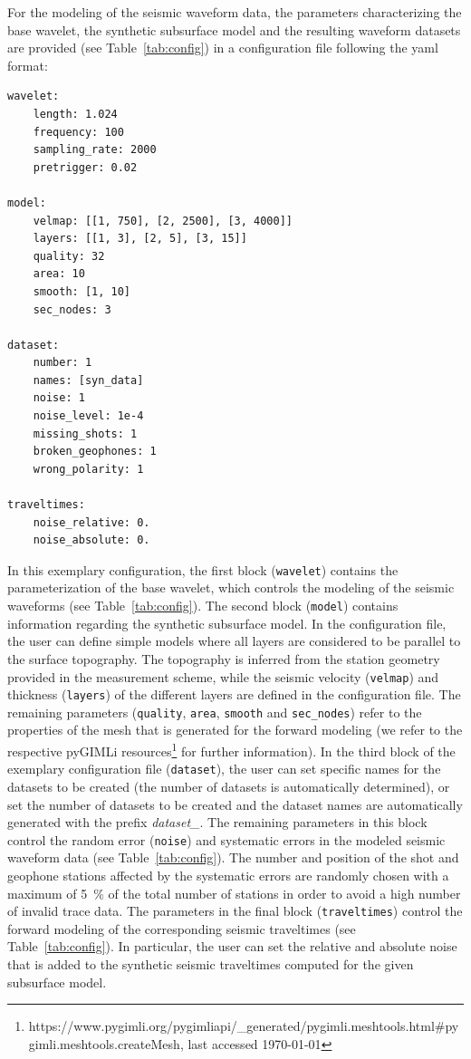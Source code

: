 \documentclass[a4paper,fleqn]{cas-sc}
\begin{document}
For the modeling of the seismic waveform data, the parameters characterizing the base wavelet, the synthetic subsurface model and the resulting waveform datasets are provided (see Table~\ref{tab:config}) in a configuration file following the yaml format:

\begin{footnotesize}
\begin{verbatim}
wavelet:
    length: 1.024
    frequency: 100
    sampling_rate: 2000
    pretrigger: 0.02

model:
    velmap: [[1, 750], [2, 2500], [3, 4000]]
    layers: [[1, 3], [2, 5], [3, 15]]
    quality: 32
    area: 10
    smooth: [1, 10]
    sec_nodes: 3    

dataset:
    number: 1
    names: [syn_data]
    noise: 1
    noise_level: 1e-4
    missing_shots: 1
    broken_geophones: 1
    wrong_polarity: 1
    
traveltimes:
    noise_relative: 0.
    noise_absolute: 0.
\end{verbatim}
\end{footnotesize}

In this exemplary configuration, the first block (\texttt{wavelet}) contains the parameterization of the base wavelet, which controls the modeling of the seismic waveforms (see Table~\ref{tab:config}).
The second block (\texttt{model}) contains information regarding the synthetic subsurface model. In the configuration file, the user can define simple models where all layers are considered to be parallel to the surface topography. The topography is inferred from the station geometry provided in the measurement scheme, while the seismic velocity (\texttt{velmap}) and thickness (\texttt{layers}) of the different layers are defined in the configuration file. The remaining parameters (\texttt{quality}, \texttt{area}, \texttt{smooth} and \texttt{sec\_nodes}) refer to the properties of the mesh that is generated for the forward modeling (we refer to the respective pyGIMLi resources\footnote{https://www.pygimli.org/pygimliapi/\_generated/pygimli.meshtools.html\#pygimli.meshtools.createMesh, last accessed \today} for further information).
In the third block of the exemplary configuration file (\texttt{dataset}), the user can set specific names for the datasets to be created (the number of datasets is automatically determined), or set the number of datasets to be created and the dataset names are automatically generated with the prefix \textit{dataset\_}.
The remaining parameters in this block control the random error (\texttt{noise}) and systematic errors in the modeled seismic waveform data (see Table~\ref{tab:config}).
The number and position of the shot and geophone stations affected by the systematic errors are randomly chosen with a maximum of \qty{5}{\%} of the total number of stations in order to avoid a high number of invalid trace data.
The parameters in the final block (\texttt{traveltimes}) control the forward modeling of the corresponding seismic traveltimes (see Table~\ref{tab:config}). In particular, the user can set the relative and absolute noise that is added to the synthetic seismic traveltimes computed for the given subsurface model.
\end{document}

